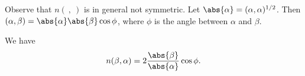Observe that $n(\ ,\ )$ is in general not symmetric. Let $\abs{\alpha} = (\alpha, \alpha)^{1/2}$.
Then $(\alpha, \beta) = \abs{\alpha}\abs{\beta}\cos\phi$, where $\phi$ is the
angle between $\alpha$ and $\beta$.

We have
\[ n(\beta, \alpha) = 2\frac{\abs{\beta}}{\abs{\alpha}}\cos\phi. \]
